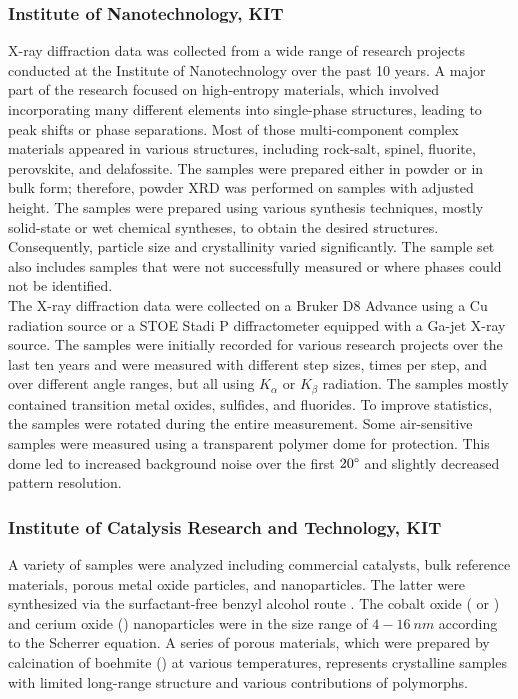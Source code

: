 \subsubsection*{Institute of Nanotechnology, KIT}

X-ray diffraction data was collected from a wide range of research projects conducted at the Institute of Nanotechnology over the past 10 years. A major part of the research focused on high-entropy materials, which involved incorporating many different elements into single-phase structures, leading to peak shifts or phase separations. Most of those multi-component complex materials appeared in various structures, including rock-salt, spinel, fluorite, perovskite, and delafossite. The samples were prepared either in powder or in bulk form; therefore, powder XRD was performed on samples with adjusted height. The samples were prepared using various synthesis techniques, mostly solid-state or wet chemical syntheses, to obtain the desired structures. Consequently, particle size and crystallinity varied significantly. The sample set also includes samples that were not successfully measured or where phases could not be identified. \\

The X-ray diffraction data were collected on a Bruker D8 Advance using a Cu radiation source or a STOE Stadi P diffractometer equipped with a Ga-jet X-ray source. The samples were initially recorded for various research projects over the last ten years and were measured with different step sizes, times per step, and over different angle ranges, but all using  $K_\alpha$ or  $K_\beta$ radiation. The samples mostly contained transition metal oxides, sulfides, and fluorides. To improve statistics, the samples were rotated during the entire measurement. Some air-sensitive samples were measured using a transparent polymer dome for protection. This dome led to increased background noise over the first $20\degree$ and slightly decreased pattern resolution. \\ 

\subsubsection*{Institute of Catalysis Research and Technology, KIT}

A variety of samples were analyzed including commercial catalysts, bulk reference materials, porous metal oxide particles, and nanoparticles. The latter were synthesized via the surfactant-free benzyl alcohol route \cite{Wolf2019, Wolf2018}. The cobalt oxide ( or ) and cerium oxide () nanoparticles were in the size range of $4-16 \ \si{nm}$ according to the Scherrer equation. A series of porous  materials, which were prepared by calcination of boehmite () at various temperatures, represents crystalline samples with limited long-range structure and various contributions of  polymorphs. \\

